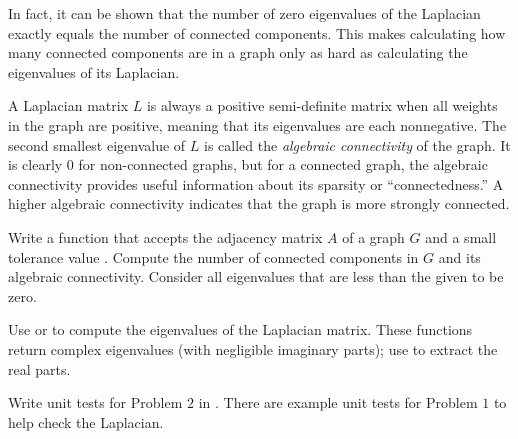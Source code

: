 In fact, it can be shown that the number of zero eigenvalues of the Laplacian exactly equals the number of connected components.
This makes calculating how many connected components are in a graph only as hard as calculating the eigenvalues of its Laplacian.

A Laplacian matrix $L$ is always a positive semi-definite matrix when all weights in the graph are positive, meaning that its eigenvalues are each nonnegative.
The second smallest eigenvalue of $L$ is called the \emph{algebraic connectivity} of the graph.
It is clearly $0$ for non-connected graphs, but for a connected graph, the algebraic connectivity provides useful information about its sparsity or ``connectedness.''
A higher algebraic connectivity indicates that the graph is more strongly connected.

\begin{problem}
Write a function that accepts the adjacency matrix $A$ of a graph $G$ and a small tolerance value .
Compute the number of connected components in $G$ and its algebraic connectivity.
Consider all eigenvalues that are less than the given  to be zero.

Use  or  to compute the eigenvalues of the Laplacian matrix.
These functions return complex eigenvalues (with negligible imaginary parts); use  to extract the real parts.
\end{problem}

\begin{unittest}
Write unit tests for Problem $2$ in . There are example unit tests for Problem $1$ to help check the Laplacian.
\end{unittest}

\begin{comment} %
\begin{problem}
The following function creates a random symmetric matrix of Boolean values with sparsity determined by the input \li{c}.
\begin{lstlisting}
def sparse_generator(n, c):
    """Return a symmetric nxn matrix with sparsity determined by c."""
    A = np.random.rand(n**2).reshape((n, n))
    A = ( A > c**(.5) )
    return A.T @ A
\end{lstlisting}

Test your function from the previous problem on matrices created by \li{sparse_generator()} with inputs $n = 10, 100$ and $c = .25, .5, .95$.
What do you notice about the likelihood that a random graph is connected?
\end{problem}
\end{comment}

